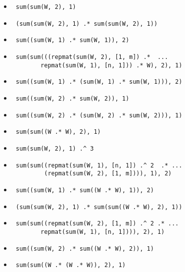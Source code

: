 \begingroup
    \fontsize{8pt}{12pt}\selectfont
\begin{itemize}
	\itemsep-5px 
	\item \begin{verbatim} sum(sum(W, 2), 1) \end{verbatim}
	\item \begin{verbatim} (sum(sum(W, 2), 1) .* sum(sum(W, 2), 1)) \end{verbatim}
	\item \begin{verbatim} sum((sum(W, 1) .* sum(W, 1)), 2) \end{verbatim}
	\item \begin{verbatim} sum(sum(((repmat(sum(W, 2), [1, m]) .*  ...
		repmat(sum(W, 1), [n, 1])) .* W), 2), 1) \end{verbatim}
	\item \begin{verbatim} sum((sum(W, 1) .* (sum(W, 1) .* sum(W, 1))), 2) \end{verbatim}
	\item \begin{verbatim} sum((sum(W, 2) .* sum(W, 2)), 1) \end{verbatim}
	\item \begin{verbatim} sum((sum(W, 2) .* (sum(W, 2) .* sum(W, 2))), 1) \end{verbatim}
	\item \begin{verbatim} sum(sum((W .* W), 2), 1) \end{verbatim}
	\item \begin{verbatim} sum(sum(W, 2), 1) .^ 3 \end{verbatim}
	\item \begin{verbatim} sum(sum((repmat(sum(W, 1), [n, 1]) .^ 2  .* ...
		 (repmat(sum(W, 2), [1, m]))), 1), 2) \end{verbatim}
	\item \begin{verbatim} sum((sum(W, 1) .* sum((W .* W), 1)), 2) \end{verbatim}
	\item \begin{verbatim} (sum(sum(W, 2), 1) .* sum(sum((W .* W), 2), 1)) \end{verbatim}
	\item \begin{verbatim} sum(sum((repmat(sum(W, 2), [1, m]) .^ 2 .* ...
		repmat(sum(W, 1), [n, 1]))), 2), 1) \end{verbatim}
	\item \begin{verbatim} sum((sum(W, 2) .* sum((W .* W), 2)), 1) \end{verbatim}
	\item \begin{verbatim} sum(sum((W .* (W .* W)), 2), 1) \end{verbatim}
\end{itemize}
\endgroup


